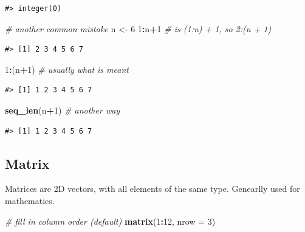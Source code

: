\documentclass[]{book}
\newenvironment{Shaded}{\begin{snugshade}}{\end{snugshade}}
\newcommand{\KeywordTok}[1]{\textcolor[rgb]{0.13,0.29,0.53}{\textbf{#1}}}
\newcommand{\DataTypeTok}[1]{\textcolor[rgb]{0.13,0.29,0.53}{#1}}
\newcommand{\DecValTok}[1]{\textcolor[rgb]{0.00,0.00,0.81}{#1}}
\newcommand{\StringTok}[1]{\textcolor[rgb]{0.31,0.60,0.02}{#1}}
\newcommand{\CommentTok}[1]{\textcolor[rgb]{0.56,0.35,0.01}{\textit{#1}}}
\newcommand{\OperatorTok}[1]{\textcolor[rgb]{0.81,0.36,0.00}{\textbf{#1}}}
\newcommand{\NormalTok}[1]{#1}
\theoremstyle{definition}
\theoremstyle{definition}
\theoremstyle{definition}
\theoremstyle{remark}
\begin{document}
\begin{verbatim}
#> integer(0)
\end{verbatim}

\begin{Shaded}
\begin{Highlighting}[]
\CommentTok{# another common mistake}
\NormalTok{n <-}\StringTok{ }\DecValTok{6}
\DecValTok{1}\OperatorTok{:}\NormalTok{n}\OperatorTok{+}\DecValTok{1}        \CommentTok{# is (1:n) + 1, so 2:(n + 1)}
\end{Highlighting}
\end{Shaded}

\begin{verbatim}
#> [1] 2 3 4 5 6 7
\end{verbatim}

\begin{Shaded}
\begin{Highlighting}[]
\DecValTok{1}\OperatorTok{:}\NormalTok{(n}\OperatorTok{+}\DecValTok{1}\NormalTok{)      }\CommentTok{# usually what is meant}
\end{Highlighting}
\end{Shaded}

\begin{verbatim}
#> [1] 1 2 3 4 5 6 7
\end{verbatim}

\begin{Shaded}
\begin{Highlighting}[]
\KeywordTok{seq_len}\NormalTok{(n}\OperatorTok{+}\DecValTok{1}\NormalTok{) }\CommentTok{# another way}
\end{Highlighting}
\end{Shaded}

\begin{verbatim}
#> [1] 1 2 3 4 5 6 7
\end{verbatim}

\subsection{Matrix}\label{matrix}

Matrices are 2D vectors, with all elements of the same type. Genearlly
used for mathematics.

\begin{Shaded}
\begin{Highlighting}[]
\CommentTok{# fill in column order (default)}
\KeywordTok{matrix}\NormalTok{(}\DecValTok{1}\OperatorTok{:}\DecValTok{12}\NormalTok{, }\DataTypeTok{nrow =} \DecValTok{3}\NormalTok{)}
\end{Highlighting}
\end{Shaded}
\end{document}
